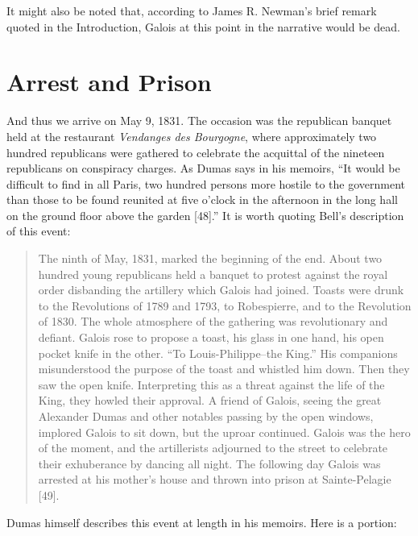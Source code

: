 \documentclass[12pt]{article}
\begin{document}
It might also be noted that, according to James R. Newman's brief remark quoted in the Introduction, Galois at this point in the narrative would be dead.

\section{Arrest and Prison}

And thus we arrive on May 9, 1831. The occasion was the republican banquet held at the restaurant \emph{Vendanges des Bourgogne}, where approximately two hundred republicans were gathered to celebrate the acquittal of the nineteen republicans on conspiracy charges. As Dumas says in his memoirs, ``It would be difficult to find in all Paris, two hundred persons more hostile to the government than those to be found reunited at five o'clock in the afternoon in the long hall on the ground floor above the garden [48].'' It is worth quoting Bell's description of this event:

\begin{quote}
The ninth of May, 1831, marked the beginning of the end. About two hundred young republicans held a banquet to protest against the royal order disbanding the artillery which Galois had joined. Toasts were drunk to the Revolutions of 1789 and 1793, to Robespierre, and to the Revolution of 1830. The whole atmosphere of the gathering was revolutionary and defiant. Galois rose to propose a toast, his glass in one hand, his open pocket knife in the other. ``To Louis-Philippe--the King.'' His companions misunderstood the purpose of the toast and whistled him down. Then they saw the open knife. Interpreting this as a threat against the life of the King, they howled their approval. A friend of Galois, seeing the great Alexander Dumas and other notables passing by the open windows, implored Galois to sit down, but the uproar continued. Galois was the hero of the moment, and the artillerists adjourned to the street to celebrate their exhuberance by dancing all night. The following day Galois was arrested at his mother's house and thrown into prison at Sainte-Pelagie [49].
\end{quote}
Dumas himself describes this event at length in his memoirs. Here is a portion:
\end{document}
